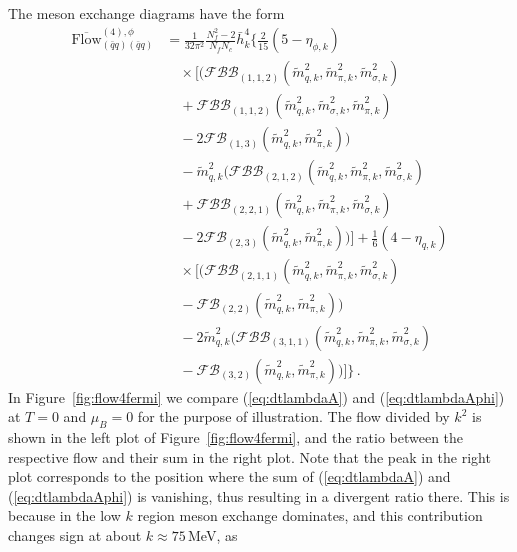 \documentclass[%
reprint,
superscriptaddress,
showpacs,preprintnumbers,
 amsmath,amssymb,
 aps,
prd,
]{revtex4-1}
\def\Fig#1{Figure~\ref{#1}}
\def\eq#1{(\ref{#1})}
\begin{document}
The meson exchange diagrams have the form
%
\begin{align}
  \overline{\textrm{Flow}}^{(4),\phi}_{(\bar q q)(\bar q q)}
  &=\frac{1}{32\pi^2}\frac{N_f^2-2}{N_fN_c}
    \bar{h}_{k}^{4}\bigg\{\frac{2}{15}(5-\eta_{\phi,k})
    \nonumber \\[1ex] 
  &\quad\times\Big[\Big(\mathcal{FBB}_{(1,1,2)}(
    \tilde{m}_{q,k}^{2},\tilde{m}_{\pi,k}^{2},
    \tilde{m}_{\sigma,k}^{2})\nonumber \\[1ex] 
  &\quad+\mathcal{FBB}_{(1,1,2)}(\tilde{m}_{q,k}^{2},
    \tilde{m}_{\sigma,k}^{2},
    \tilde{m}_{\pi,k}^{2})\nonumber \\[1ex] 
  &\quad-2\mathcal{FB}_{(1,3)}(\tilde{m}_{q,k}^{2},
    \tilde{m}_{\pi,k}^{2})
    \Big)\nonumber \\[1ex] 
  &\quad-\tilde{m}_{q,k}^{2}\Big(
    \mathcal{FBB}_{(2,1,2)}(\tilde{m}_{q,k}^{2},
    \tilde{m}_{\pi,k}^{2},\tilde{m}_{\sigma,k}^{2})
    \nonumber \\[1ex] 
  &\quad+\mathcal{FBB}_{(2,2,1)}(\tilde{m}_{q,k}^{2},\tilde{m}_{\pi,k}^{2},
    \tilde{m}_{\sigma,k}^{2})\nonumber \\[1ex] 
  &\quad-2\mathcal{FB}_{(2,3)}(\tilde{m}_{q,k}^{2},\tilde{m}_{\pi,k}^{2})\Big)\Big]
    +\frac{1}{6}(4-\eta_{q,k})\nonumber \\[1ex] 
  &\quad\times\Big[\Big(\mathcal{FBB}_{(2,1,1)}(\tilde{m}_{q,k}^{2},
    \tilde{m}_{\pi,k}^{2},\tilde{m}_{\sigma,k}^{2})\nonumber \\[1ex] 
  &\quad-\mathcal{FB}_{(2,2)}(\tilde{m}_{q,k}^{2},\tilde{m}_{\pi,k}^{2})
    \Big)\nonumber \\[1ex] 
  &\quad-2\tilde{m}_{q,k}^{2}\Big(\mathcal{FBB}_{(3,1,1)}(\tilde{m}_{q,k}^{2},
    \tilde{m}_{\pi,k}^{2},\tilde{m}_{\sigma,k}^{2})\nonumber \\[1ex] 
  &\quad-\mathcal{FB}_{(3,2)}(\tilde{m}_{q,k}^{2},\tilde{m}_{\pi,k}^{2})
    \Big)\Big]\bigg\}\,.
 \label{eq:dtlambdaAphi}
\end{align}
%
In \Fig{fig:flow4fermi} we compare \eq{eq:dtlambdaA} and
\eq{eq:dtlambdaAphi} at $T=0$ and $\mu_B=0$ for the purpose of
illustration. The flow divided by $k^2$ is shown in the left plot of
\Fig{fig:flow4fermi}, and the ratio between the respective flow and
their sum in the right plot. Note that the peak in the right plot
corresponds to the position where the sum of \eq{eq:dtlambdaA} and
\eq{eq:dtlambdaAphi} is vanishing, thus resulting in a divergent ratio
there. This is because in the low $k$ region meson exchange dominates,
and this contribution changes sign at about $k \approx 75$\,MeV, as
\end{document}
